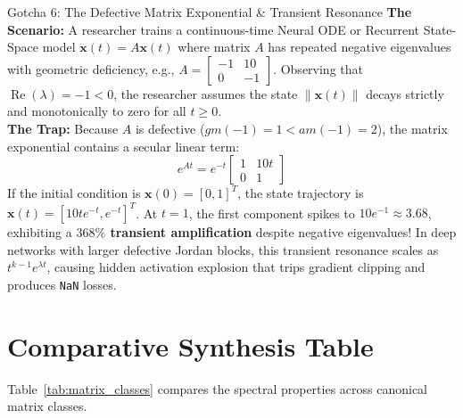 \begin{trapbox}{Gotcha 6: The Defective Matrix Exponential \& Transient Resonance}
\textbf{The Scenario:} A researcher trains a continuous-time Neural ODE or Recurrent State-Space model $\dot{\mathbf{x}}(t) = A \mathbf{x}(t)$ where matrix $A$ has repeated negative eigenvalues with geometric deficiency, e.g., $A = \begin{bmatrix} -1 & 10 \\ 0 & -1 \end{bmatrix}$. Observing that $\operatorname{Re}(\lambda) = -1 < 0$, the researcher assumes the state $\|\mathbf{x}(t)\|$ decays strictly and monotonically to zero for all $t \ge 0$. \\
\textbf{The Trap:} Because $A$ is defective ($gm(-1) = 1 < am(-1) = 2$), the matrix exponential contains a secular linear term:
\begin{equation*}
e^{At} = e^{-t} \begin{bmatrix} 1 & 10t \\ 0 & 1 \end{bmatrix}
\end{equation*}
If the initial condition is $\mathbf{x}(0) = [0, 1]^T$, the state trajectory is $\mathbf{x}(t) = [10t e^{-t}, e^{-t}]^T$. At $t = 1$, the first component spikes to $10 e^{-1} \approx 3.68$, exhibiting a \textbf{$368\%$ transient amplification} despite negative eigenvalues! In deep networks with larger defective Jordan blocks, this transient resonance scales as $t^{k-1} e^{\lambda t}$, causing hidden activation explosion that trips gradient clipping and produces \texttt{NaN} losses.
\end{trapbox}

\section{Comparative Synthesis Table}

Table~\ref{tab:matrix_classes} compares the spectral properties across canonical matrix classes.

